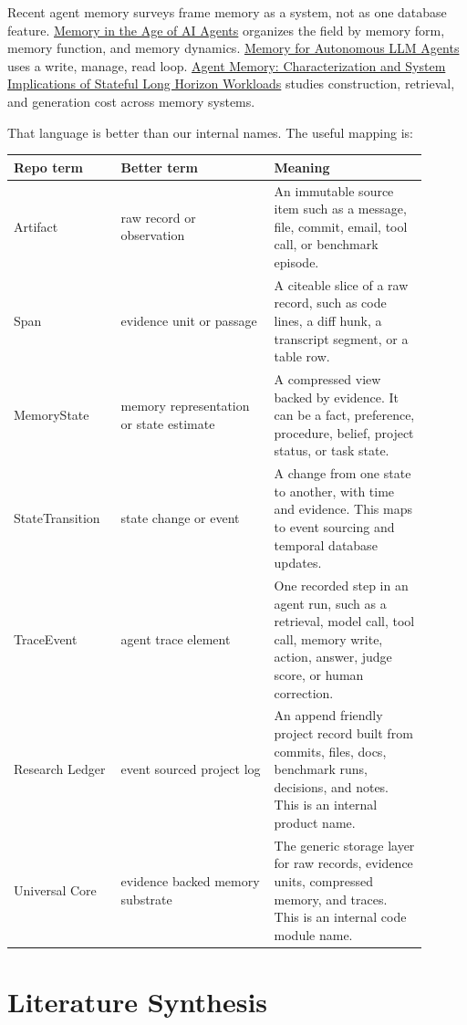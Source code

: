\documentclass[11pt]{article}
\begin{document}
Recent agent memory surveys frame memory as a system, not as one database feature. \href{https://arxiv.org/abs/2512.13564}{Memory in the Age of AI Agents} organizes the field by memory form, memory function, and memory dynamics. \href{https://arxiv.org/abs/2603.07670}{Memory for Autonomous LLM Agents} uses a write, manage, read loop. \href{https://arxiv.org/abs/2606.06448}{Agent Memory: Characterization and System Implications of Stateful Long Horizon Workloads} studies construction, retrieval, and generation cost across memory systems.

That language is better than our internal names. The useful mapping is:

\begin{longtable}{p{0.22\linewidth} p{0.34\linewidth} p{0.34\linewidth}}
\toprule
Repo term & Better term & Meaning \\
\midrule
Artifact & raw record or observation & An immutable source item such as a message, file, commit, email, tool call, or benchmark episode. \\
Span & evidence unit or passage & A citeable slice of a raw record, such as code lines, a diff hunk, a transcript segment, or a table row. \\
MemoryState & memory representation or state estimate & A compressed view backed by evidence. It can be a fact, preference, procedure, belief, project status, or task state. \\
StateTransition & state change or event & A change from one state to another, with time and evidence. This maps to event sourcing and temporal database updates. \\
TraceEvent & agent trace element & One recorded step in an agent run, such as a retrieval, model call, tool call, memory write, action, answer, judge score, or human correction. \\
Research Ledger & event sourced project log & An append friendly project record built from commits, files, docs, benchmark runs, decisions, and notes. This is an internal product name. \\
Universal Core & evidence backed memory substrate & The generic storage layer for raw records, evidence units, compressed memory, and traces. This is an internal code module name. \\
\bottomrule
\end{longtable}

\section{Literature Synthesis}
\end{document}
